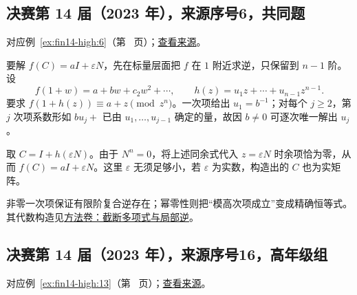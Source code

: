 \documentclass[UTF8,12pt,a4paper,fontset=fandol]{ctexart}
\begin{document}
\subsection{决赛第 14 届（2023 年），来源序号6，共同题}\label{ans:fin14-high:6}\label{pr:fin14-high:6}

对应例~\ref{ex:fin14-high:6}（第~\pageref{ex:fin14-high:6} 页）；\href{https://github.com/lzxcr/cmc-mathematics/blob/64916fa1fdbc3e444a652eca204d5669058ee321/src/problems/finals/14/06.md}{查看来源}。

\begin{solve}

要解 $f(C)=aI+\varepsilon N$，先在标量层面把 $f$ 在 $1$ 附近求逆，只保留到 $n-1$ 阶。设
\[
f(1+w)=a+bw+c_2w^2+\cdots,
\qquad h(z)=u_1z+\cdots+u_{n-1}z^{n-1}.
\]
要求 $f(1+h(z))\equiv a+z\pmod{z^n}$。一次项给出 $u_1=b^{-1}$；对每个 $j\ge2$，第 $j$ 次项系数形如 $bu_j+$ 已由 $u_1,\ldots,u_{j-1}$ 确定的量，故因 $b\ne0$ 可逐次唯一解出 $u_j$。

取 $C=I+h(\varepsilon N)$。由于 $N^n=0$，将上述同余式代入 $z=\varepsilon N$ 时余项恰为零，从而 $f(C)=aI+\varepsilon N$。这里 $\varepsilon$ 无须足够小，若 $\varepsilon$ 为实数，构造出的 $C$ 也为实矩阵。

\end{solve}

\begin{remark}[方法与条件]

非零一次项保证有限阶复合逆存在；幂零性则把“模高次项成立”变成精确恒等式。其代数构造见\hyperref[app:algebra-interpolation]{方法卷：截断多项式与局部逆}。

\end{remark}

\subsection{决赛第 14 届（2023 年），来源序号16，高年级组}\label{ans:fin14-high:13}\label{pr:fin14-high:13}

对应例~\ref{ex:fin14-high:13}（第~\pageref{ex:fin14-high:13} 页）；\href{https://github.com/lzxcr/cmc-mathematics/blob/64916fa1fdbc3e444a652eca204d5669058ee321/src/problems/finals/14/16.md}{查看来源}。
\end{document}
